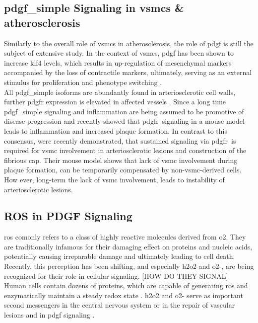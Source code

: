     \subsection{\ac{pdgf_simple} Signaling in \acp{vsmc} \& atherosclerosis}
    \label{subsec:pdgf_in_disease}
    Similarly to the overall role of \acp{vsmc} in atherosclerosis, the role of \ac{pdgf} is still the subject of extensive study. In the context of \acp{vsmc}, \ac{pdgf} has been shown to increase \ac{klf4} levels, which results in up-regulation of mesenchymal markers accompanied by the loss of contractile markers, ultimately, serving as an external stimulus for proliferation and phenotype switching \cite{yapSixShadesVascular2021}.\\
    All \ac{pdgf_simple} isoforms are abundantly found in arteriosclerotic cell walls, further \ac{pdgfr} expression is elevated in affected vessels \cite{huTargetingPlateletderivedGrowth2015}. Since a long time \ac{pdgf_simple} signaling and inflammation are being assumed to be promotive of disease progression \cite{andraeRolePlateletderivedGrowth2008, chenPlateletderivedGrowthFactors2013, huTargetingPlateletderivedGrowth2015} and recently \textcite{hePDGFRvSignallingRegulates2015} showed that \ac{pdgfr}\beta~signaling in a mouse model leads to inflammation and increased plaque formation. In contrast to this consensus, \textcite{newmanMultipleCellTypes2021} were recently demonstrated, that sustained signaling via \ac{pdgfr}\beta~is required for \ac{vsmc} involvement in arteriosclerotic lesions and construction of the fibrious cap. Their mouse model shows that lack of \ac{vsmc} involvement during plaque formation, can be temporarily compensated by non-\ac{vsmc}-derived cells. How ever, long-term the lack of \ac{vsmc} involvement, leads to instability of arteriosclerotic lesions.

    \subsection{ROS in PDGF Signaling}
    \label{subsec:ROS_signaling}
    \Ac{ros} comonly refers to a class of highly reactive molecules derived from \ac{o2}. They are traditionally infamous for their damaging effect on proteins and nucleic acids, potentially causing irreparable damage and ultimately leading to cell death. Recently, this perception has been shifting, and especially \ac{h2o2} and \ac{o2-}, are being recognized for their role in cellular signaling. \cite{siesReactiveOxygenSpecies2020} [HOW DO THEY SIGNAL] \\
    Human cells contain dozens of proteins, which are capable of generating \ac{ros} and enzymatically maintain a steady redox state \cite{siesReactiveOxygenSpecies2020}. \ac{h2o2} and \ac{o2-} serve as important second messengers in the central nervous system \cite{nayerniaNewInsightsNOX2014} or in the repair of vascular lesions \cite{andraeRolePlateletderivedGrowth2008} and in \ac{pdgf} signaling \cite{sundaresanRequirementGenerationH2O21995, bouziguesRegulationROSResponse2014a}.


